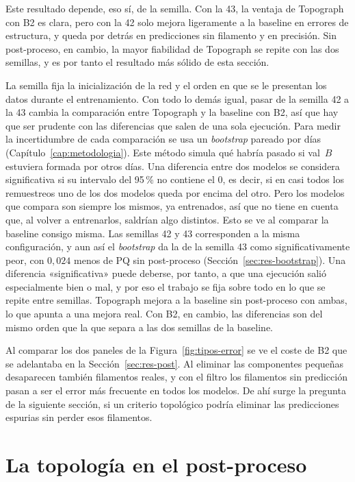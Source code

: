 Este resultado depende, eso sí, de la semilla. Con la 43, la ventaja de
Topograph con B2 es clara, pero con la 42 solo mejora ligeramente a la
baseline en errores de estructura, y queda por detrás en predicciones
sin filamento y en precisión. Sin post-proceso, en cambio, la mayor
fiabilidad de Topograph se repite con las dos semillas, y es por tanto
el resultado más sólido de esta sección.

La semilla fija la inicialización de la red y el orden en que se le
presentan los datos durante el entrenamiento. Con todo lo demás igual,
pasar de la semilla 42 a la 43 cambia la comparación entre Topograph y
la baseline con B2, así que hay que ser prudente con las diferencias que
salen de una sola ejecución. Para medir la incertidumbre
de cada comparación se usa un \emph{bootstrap} pareado por días
(Capítulo~\ref{cap:metodologia}). Este método simula qué habría pasado
si val~$B$ estuviera formada por otros días. Una diferencia entre dos
modelos se considera significativa si su intervalo del 95\,\% no
contiene el $0$, es decir, si en casi todos los remuestreos uno de los
dos modelos queda por encima del otro. Pero
los modelos que compara son siempre los mismos, ya entrenados, así que
no tiene en cuenta que, al volver a entrenarlos, saldrían algo
distintos. Esto se ve al comparar la baseline consigo misma. Las
semillas 42 y 43 corresponden a la misma configuración, y aun así el
\emph{bootstrap} da la de la semilla 43 como significativamente peor,
con $0{,}024$ menos de PQ sin post-proceso
(Sección~\ref{sec:res-bootstrap}). Una diferencia «significativa» puede
deberse, por tanto, a que una ejecución salió especialmente bien o mal,
y por eso el trabajo se fija sobre todo en lo que se repite entre
semillas. Topograph mejora a la baseline sin post-proceso con ambas, lo
que apunta a una mejora real. Con B2, en cambio, las diferencias son del
mismo orden que la que separa a las dos semillas de la baseline.

Al comparar los dos paneles de la Figura~\ref{fig:tipos-error} se ve el
coste de B2 que se adelantaba en la Sección~\ref{sec:res-post}. Al
eliminar las componentes pequeñas desaparecen también filamentos reales,
y con el filtro los filamentos sin predicción pasan a ser el error más
frecuente en todos los modelos. De ahí surge la pregunta de la siguiente
sección, si un criterio topológico podría eliminar las predicciones
espurias sin perder esos filamentos.

\section{La topología en el post-proceso}
\label{sec:res-e2}

